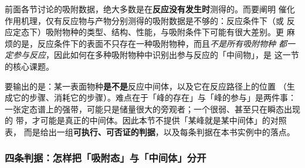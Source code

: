 前面各节讨论的吸附数据，绝大多数是在\textbf{反应没有发生时}测得的。而要阐明
催化作用机理，仅有反应物与产物分别测得的吸附数据是不够的：反应条件下（或
反应定态下）吸附物种的类型、结构、性能，与吸附条件下可能有很大差别。更
麻烦的是，反应条件下的表面不只存在一种吸附物种，而且\emph{不是所有吸附物种
都一定参与反应}，因此如何在多种吸附物种中识别出参与反应的「中间物」，是
这一节的核心课题。

\begin{probout}
要输出的是：某一表面物种\textbf{是不是}反应中间体，以及它在反应路径上的位置
（生成它的步骤、消耗它的步骤）。难点在于「峰的存在」与「峰的参与」是两件事：
一张定态谱上的强带，可能只是储量很大的旁观者；一个很弱、甚至只在瞬态出现的
带，才可能是真正的中间体。因此本节不提供「某峰就是某中间体」的对照表，
而是给出一组\textbf{可执行、可否证的判据}，以及每条判据在本书实例中的落点。
\end{probout}

\subsubsection{四条判据：怎样把「吸附态」与「中间体」分开}

